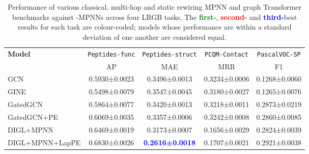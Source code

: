 \documentclass{article}
\theoremstyle{plain}
\theoremstyle{definition}
\theoremstyle{remark}
\begin{document}
\begin{table*}[h]
\centering
\caption{Performance of various classical, multi-hop and static rewiring MPNN and graph Transformer benchmarks against -MPNNs across four LRGB tasks. The \textbf{\textcolor{green}{first-}}, \textbf{\textcolor{red}{second-}} and \textbf{\textcolor{blue}{third-}}best results for each task are colour-coded; models whose performance are within a standard deviation of one another are considered equal.}
\label{tab:all_results}
\begin{tabular}{@{}lcccc@{}}
\toprule
\multirow{2}{*}{\textbf{Model}} & \texttt{Peptides-func}                    & \texttt{Peptides-struct}                  & \texttt{PCQM-Contact}                     & \texttt{PascalVOC-SP}                     \\
                                & AP                              & MAE                           & MRR                             & F1                              \\ \midrule
GCN                             & 0.5930\small±0.0023                             & 0.3496\small±0.0013                             & 0.3234\small±0.0006                             & 0.1268\small±0.0060                             \\
GINE                            & 0.5498\small±0.0079                             & 0.3547\small±0.0045                             & 0.3180\small±0.0027                             & 0.1265\small±0.0076                             \\
GatedGCN                        & 0.5864\small±0.0077                             & 0.3420\small±0.0013                             & 0.3218\small±0.0011                             & 0.2873\small±0.0219                             \\
GatedGCN+PE     & 0.6069\small±0.0035                             & 0.3357\small±0.0006                             & 0.3242\small±0.0008                             & 0.2860\small±0.0085                             \\ \midrule
DIGL+MPNN       & 0.6469\small±0.0019                             & 0.3173\small±0.0007                             & 0.1656\small±0.0029                             & 0.2824\small±0.0039                             \\
DIGL+MPNN+LapPE & 0.6830\small±0.0026                             & \textbf{\textcolor{blue}{0.2616\small\small±0.0018}}  & 0.1707\small±0.0021                             & 0.2921\small±0.0038                             \\

\end{tabular}
\end{table*}
\end{document}
